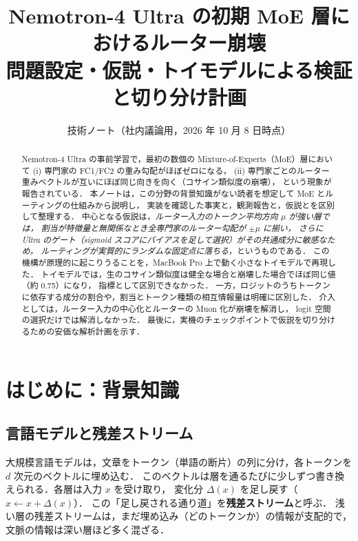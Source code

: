 \documentclass[a4paper,11pt]{ltjsarticle}
\title{Nemotron-4 Ultra の初期 MoE 層におけるルーター崩壊\\[2mm]
\large 問題設定・仮説・トイモデルによる検証と切り分け計画}
\author{技術ノート（社内議論用，2026 年 10 月 8 日時点）}
\date{}
\theoremstyle{definition}
\theoremstyle{plain}
\begin{document}
\maketitle

\begin{abstract}
Nemotron-4 Ultra の事前学習で，最初の数個の Mixture-of-Experts（MoE）層において
(i) 専門家の FC1/FC2 の重み勾配がほぼゼロになる，
(ii) 専門家ごとのルーター重みベクトルが互いにほぼ同じ向きを向く（コサイン類似度の崩壊），
という現象が報告されている．
本ノートは，この分野の背景知識がない読者を想定して MoE とルーティングの仕組みから説明し，
実装を確認した事実と，観測報告と，仮説とを区別して整理する．
中心となる仮説は，\emph{ルーター入力のトークン平均方向 $\mu$ が強い層では，
割当が特徴量と無関係なとき全専門家のルーター勾配が $\pm\mu$ に揃い，
さらに Ultra のゲート（sigmoid スコアにバイアスを足して選択）がその共通成分に敏感なため，
ルーティングが実質的にランダムな固定点に落ちる}，というものである．
この機構が原理的に起こりうることを，MacBook Pro 上で動く小さなトイモデルで再現した．
トイモデルでは，生のコサイン類似度は健全な場合と崩壊した場合でほぼ同じ値（約 0.75）になり，
指標として区別できなかった．
一方，ロジットのうちトークンに依存する成分の割合や，割当とトークン種類の相互情報量は明確に区別した．
介入としては，ルーター入力の中心化とルーターの Muon 化が崩壊を解消し，
logit 空間の選択だけでは解消しなかった．
最後に，実機のチェックポイントで仮説を切り分けるための安価な解析計画を示す．
\end{abstract}

\tableofcontents
\newpage

\section{はじめに：背景知識}

\subsection{言語モデルと残差ストリーム}
大規模言語モデルは，文章をトークン（単語の断片）の列に分け，各トークンを $d$ 次元のベクトルに埋め込む．
このベクトルは層を通るたびに少しずつ書き換えられる．各層は入力 $x$ を受け取り，
変化分 $\Delta(x)$ を足し戻す（$x \leftarrow x + \Delta(x)$）．
この「足し戻される通り道」を\textbf{残差ストリーム}と呼ぶ．
浅い層の残差ストリームは，まだ埋め込み（どのトークンか）の情報が支配的で，
文脈の情報は深い層ほど多く混ざる．
\end{document}
